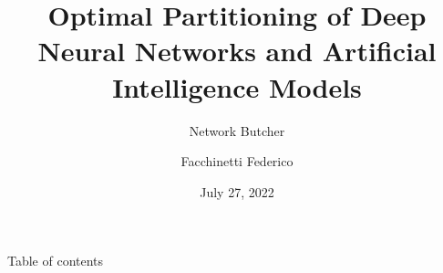 \documentclass[aspectratio=169,xcolor=dvipsnames,xcolor=table]{beamer}
\title[Network-butcher]{Optimal Partitioning of Deep Neural Networks and Artificial Intelligence Models}
\subtitle{Network Butcher}
\author[Facchinetti] {Facchinetti Federico}
\date{July 27, 2022} %
\begin{document}
\begin{frame}
    \titlepage
\end{frame}

\begin{frame}{Table of contents}
      \tableofcontents
\end{frame}







\end{document}
